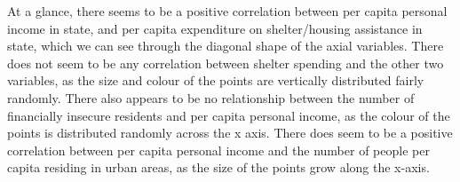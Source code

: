 \documentclass[12pt,letterpaper]{article}
\begin{document}
\noindent At a glance, there seems to be a positive correlation between per capita personal income in state, and per capita expenditure on shelter/housing assistance in state, which we can see through the diagonal shape of the axial variables. There does not seem to be any correlation between shelter spending and the other two variables, as the size and colour of the points are vertically distributed fairly randomly. There also appears to be no relationship between the number of financially insecure residents and per capita personal income, as the colour of the points is distributed randomly across the x axis. There does seem to be a positive correlation between per capita personal income and the number of people per capita residing in urban areas, as the size of the points grow along the x-axis.
\end{document}
